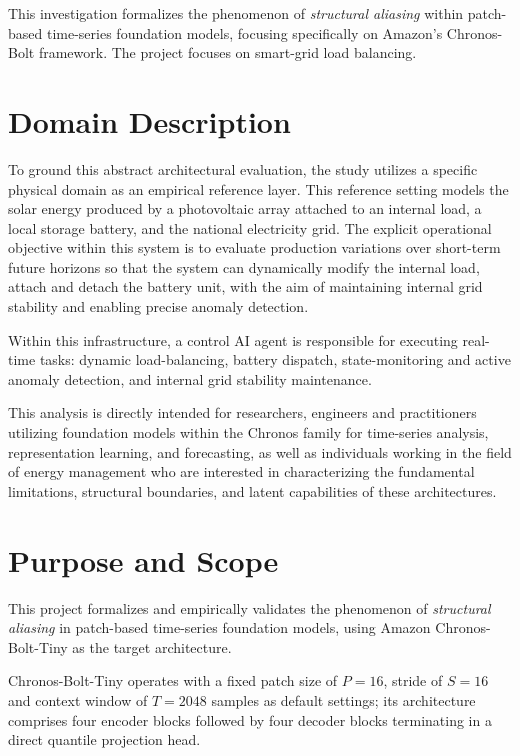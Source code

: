 This investigation formalizes the phenomenon of \textit{structural aliasing} within patch-based time-series foundation models, focusing specifically on Amazon's Chronos-Bolt framework.\cite{ansariChronosLearningLanguage2024, FastAccurateZeroshot2024a} The project focuses on smart-grid load balancing. 

\section{Domain Description}
To ground this abstract architectural evaluation, the study utilizes a specific physical domain as an empirical reference layer. This reference setting models the solar energy produced by a photovoltaic array attached to an internal load, a local storage battery, and the national electricity grid. The explicit operational objective within this system is to evaluate production variations over short-term future horizons so that the system can dynamically modify the internal load, attach and detach the battery unit, with the aim of maintaining internal grid stability and enabling precise anomaly detection. 

Within this infrastructure, a control AI agent is responsible for executing real-time tasks: dynamic load-balancing, battery dispatch, state-monitoring and active anomaly detection, and internal grid stability maintenance.

This analysis is directly intended for researchers, engineers and practitioners utilizing foundation models within the Chronos family for time-series analysis, representation learning, and forecasting, as well as individuals working in the field of energy management who are interested in characterizing the fundamental limitations, structural boundaries, and latent capabilities of these architectures. 

\section{Purpose and Scope}
This project formalizes and empirically validates the phenomenon of \textit{structural aliasing} in patch-based time-series foundation models, using Amazon Chronos-Bolt-Tiny as the target architecture.

Chronos-Bolt-Tiny operates with a fixed patch size of $P=16$, stride of $S=16$ and context window of $T=2048$ samples as default settings; its architecture comprises four encoder blocks followed by four decoder blocks terminating in a direct quantile projection head.\cite{AmazonChronosbolttinyHugging2025, ChronosBoltPipelineAmazonscienceChronosforecastinga}

